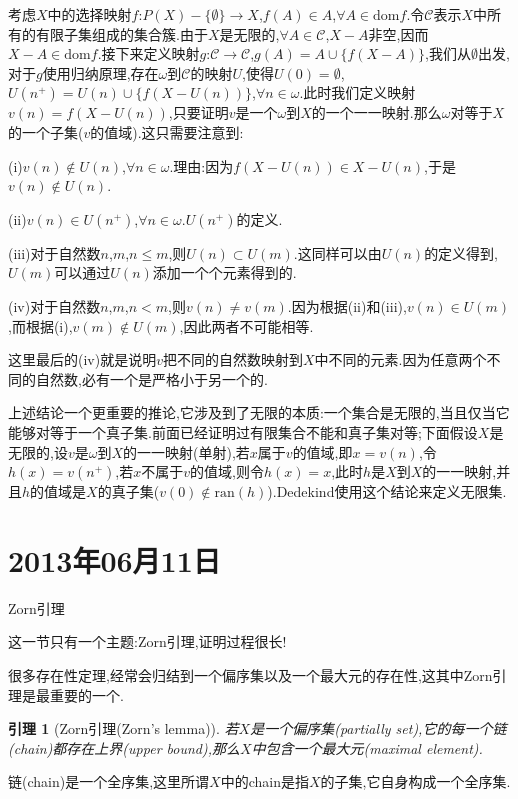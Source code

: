 \documentclass[12pt,a4paper,openany]{book}
\newtheorem{lemma}{引理}[section]
\begin{document}
考虑$X$中的选择映射$f$:$P(X)-\{\emptyset\} \to X$,$f(A) \in A$,$\forall A \in \text{dom}{f}$.令$\mathscr{C}$表示$X$中所有的有限子集组成的集合簇.由于$X$是无限的,$\forall A \in \mathscr{C}$,$X-A$非空,因而$X-A \in \text{dom}{f}$.接下来定义映射$g$:$\mathscr{C} \to \mathscr{C}$,$g(A)=A \cup \{f(X-A)\}$,我们从$\emptyset$出发,对于$g$使用归纳原理,存在$\omega$到$\mathscr{C}$的映射$U$,使得$U(0)=\emptyset$,$U(n^+)=U(n) \cup \{f(X-U(n))\}$,$\forall n \in \omega$.此时我们定义映射$v(n)=f(X-U(n))$,只要证明$v$是一个$\omega$到$X$的一个一一映射.那么$\omega$对等于$X$的一个子集($v$的值域).这只需要注意到:

(i)$v(n) \notin U(n)$,$\forall n \in \omega$.理由:因为$f(X-U(n)) \in X-U(n)$,于是$v(n) \notin U(n)$.

(ii)$v(n) \in U(n^+)$,$\forall n \in \omega$.$U(n^+)$的定义.

(iii)对于自然数$n$,$m$,$n \le m$,则$U(n) \subset U(m)$.这同样可以由$U(n)$的定义得到,$U(m)$可以通过$U(n)$添加一个个元素得到的.

(iv)对于自然数$n$,$m$,$n<m$,则$v(n) \neq v(m)$.因为根据(ii)和(iii),$v(n) \in U(m)$,而根据(i),$v(m) \notin U(m)$,因此两者不可能相等.

这里最后的(iv)就是说明$v$把不同的自然数映射到$X$中不同的元素.因为任意两个不同的自然数,必有一个是严格小于另一个的.

上述结论一个更重要的推论,它涉及到了无限的本质:一个集合是无限的,当且仅当它能够对等于一个真子集.前面已经证明过有限集合不能和真子集对等;下面假设$X$是无限的,设$v$是$\omega$到$X$的一一映射(单射),若$x$属于$v$的值域,即$x=v(n)$,令$h(x)=v(n^+)$,若$x$不属于$v$的值域,则令$h(x)=x$,此时$h$是$X$到$X$的一一映射,并且$h$的值域是$X$的真子集($v(0) \notin \text{ran}{(h)}$).Dedekind使用这个结论来定义无限集.

\section{2013年06月11日}
Zorn引理

这一节只有一个主题:Zorn引理,证明过程很长!

很多存在性定理,经常会归结到一个偏序集以及一个最大元的存在性,这其中Zorn引理是最重要的一个.

\begin{lemma}[Zorn引理(Zorn's lemma)]
若$X$是一个偏序集(partially set),它的每一个链(chain)都存在上界(upper bound),那么$X$中包含一个最大元(maximal element).
\end{lemma}

链(chain)是一个全序集,这里所谓$X$中的chain是指$X$的子集,它自身构成一个全序集.
\end{document}
